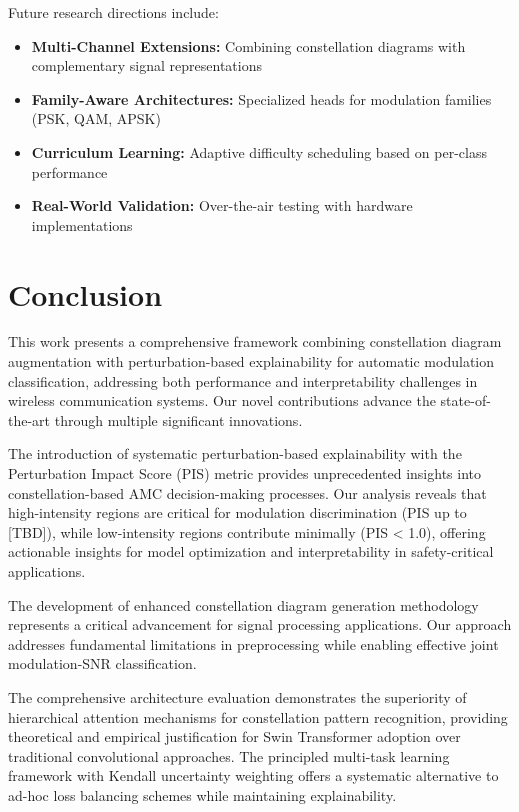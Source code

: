 \documentclass{ELSP}
\begin{document}
{{Future research directions include:
\begin{itemize}
    \item \textbf{Multi-Channel Extensions:} Combining constellation diagrams with complementary signal representations
    \item \textbf{Family-Aware Architectures:} Specialized heads for modulation families (PSK, QAM, APSK)
    \item \textbf{Curriculum Learning:} Adaptive difficulty scheduling based on per-class performance
    \item \textbf{Real-World Validation:} Over-the-air testing with hardware implementations
\end{itemize}

\section{Conclusion}

This work presents a comprehensive framework combining constellation diagram augmentation with perturbation-based explainability for automatic modulation classification, addressing both performance and interpretability challenges in wireless communication systems. Our novel contributions advance the state-of-the-art through multiple significant innovations.

The introduction of systematic perturbation-based explainability with the Perturbation Impact Score (PIS) metric provides unprecedented insights into constellation-based AMC decision-making processes. Our analysis reveals that high-intensity regions are critical for modulation discrimination (PIS up to [TBD]), while low-intensity regions contribute minimally (PIS < 1.0), offering actionable insights for model optimization and interpretability in safety-critical applications.

The development of enhanced constellation diagram generation methodology represents a critical advancement for signal processing applications. Our approach addresses fundamental limitations in preprocessing while enabling effective joint modulation-SNR classification.

The comprehensive architecture evaluation demonstrates the superiority of hierarchical attention mechanisms for constellation pattern recognition, providing theoretical and empirical justification for Swin Transformer adoption over traditional convolutional approaches. The principled multi-task learning framework with Kendall uncertainty weighting offers a systematic alternative to ad-hoc loss balancing schemes while maintaining explainability.

}}
\end{document}

